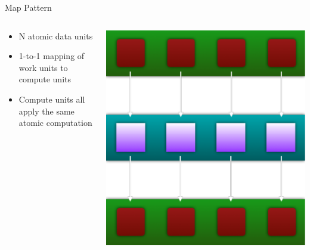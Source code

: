 \documentclass[xcolor=dvipsnames]{beamer}
\begin{document}
	\begin{frame}{Map Pattern}
		\begin{columns}
			\begin{column}{0.5\textwidth}
				\begin{itemize}
					\item N atomic data units
					\item 1-to-1 mapping of work units to compute units
					\item Compute units all apply the same atomic computation
				\end{itemize}
			\end{column}
			\begin{column}{0.5\textwidth}
				\includegraphics[width=\textwidth]{images/mapPattern}
			\end{column}
		\end{columns}
	\end{frame}
	
\end{document}
